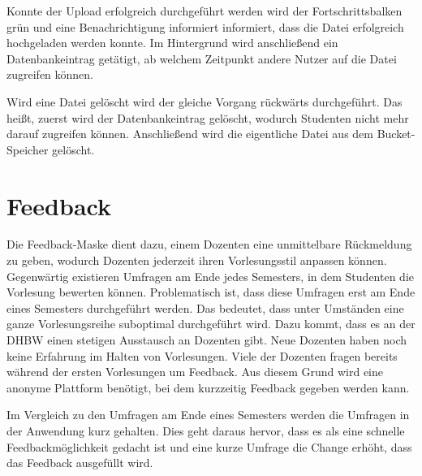 Konnte der Upload erfolgreich durchgeführt werden wird der Fortschrittsbalken grün und eine Benachrichtigung informiert informiert, dass die Datei erfolgreich hochgeladen werden konnte.
Im Hintergrund wird anschließend ein Datenbankeintrag getätigt, ab welchem Zeitpunkt andere Nutzer auf die Datei zugreifen können.

Wird eine Datei gelöscht wird der gleiche Vorgang rückwärts durchgeführt.
Das heißt, zuerst wird der Datenbankeintrag gelöscht, wodurch Studenten nicht mehr darauf zugreifen können.
Anschließend wird die eigentliche Datei aus dem Bucket-Speicher gelöscht.











\section{Feedback}
Die Feedback-Maske dient dazu, einem Dozenten eine unmittelbare Rückmeldung zu geben, wodurch Dozenten jederzeit ihren Vorlesungsstil anpassen können.
Gegenwärtig existieren Umfragen am Ende jedes Semesters, in dem Studenten die Vorlesung bewerten können.
Problematisch ist, dass diese Umfragen erst am Ende eines Semesters durchgeführt werden.
Das bedeutet, dass unter Umständen eine ganze Vorlesungsreihe suboptimal durchgeführt wird.
Dazu kommt, dass es an der DHBW einen stetigen Ausstausch an Dozenten gibt.
Neue Dozenten haben noch keine Erfahrung im Halten von Vorlesungen.
Viele der Dozenten fragen bereits während der ersten Vorlesungen um Feedback.
Aus diesem Grund wird eine anonyme Plattform benötigt, bei dem kurzzeitig Feedback gegeben werden kann.

Im Vergleich zu den Umfragen am Ende eines Semesters werden die Umfragen in der Anwendung kurz gehalten.
Dies geht daraus hervor, dass es als eine schnelle Feedbackmöglichkeit gedacht ist und eine kurze Umfrage die Change erhöht, dass das Feedback ausgefüllt wird.






